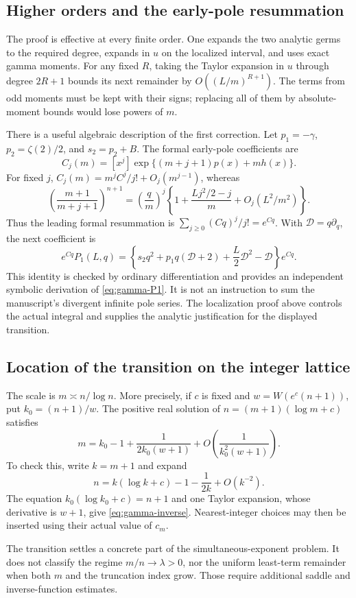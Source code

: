 \subsection{Higher orders and the early-pole resummation}
The proof is effective at every finite order. One expands the two
analytic germs to the required degree, expands in $u$ on the localized
interval, and uses exact gamma moments. For any fixed $R$, taking
the Taylor expansion in $u$ through degree $2R+1$ bounds its next
remainder by $O((L/m)^{R+1})$. The terms from odd moments must be
kept with their signs; replacing all of them by absolute-moment
bounds would lose powers of $m$.

There is a useful algebraic description of the first correction.
Let $p_1=-\gamma$, $p_2=\zeta(2)/2$, and $s_2=p_2+B$.
The formal early-pole coefficients are
\[
 C_j(m)=[x^j]\exp\{(m+j+1)p(x)+mh(x)\}.
\]
For fixed $j$, $C_j(m)=m^jC^j/j!+O_j(m^{j-1})$, whereas
\[
 \left(\frac{m+1}{m+j+1}\right)^{n+1}
 =\left(\frac qm\right)^j
 \left\{1+\frac{Lj^2/2-j}{m}+O_j(L^2/m^2)\right\}.
\]
Thus the leading formal resummation is
$\sum_{j\ge0}(Cq)^j/j!=e^{Cq}$. With $\mathcal D=q\partial_q$,
the next coefficient is
\begin{equation}\label{eq:gamma-operator}
 e^{Cq}P_1(L,q)=
 \left\{s_2q^2+p_1q(\mathcal D+2)
                    +\frac L2\mathcal D^2-\mathcal D\right\}e^{Cq}.
\end{equation}
This identity is checked by ordinary differentiation and provides an
independent symbolic derivation of \eqref{eq:gamma-P1}.
It is not an instruction to sum the manuscript's divergent infinite
pole series. The localization proof above controls the actual integral
and supplies the analytic justification for the displayed transition.

\subsection{Location of the transition on the integer lattice}
The scale is $m\asymp n/\log n$. More precisely, if $c$ is fixed and
$w=W(e^c(n+1))$, put $k_0=(n+1)/w$. The positive real solution of
$n=(m+1)(\log m+c)$ satisfies
\begin{equation}\label{eq:gamma-inverse}
 m=k_0-1+\frac1{2k_0(w+1)}
       +O\!\left(\frac1{k_0^2(w+1)}\right).
\end{equation}
To check this, write $k=m+1$ and expand
\[
 n=k(\log k+c)-1-\frac1{2k}+O(k^{-2}).
\]
The equation $k_0(\log k_0+c)=n+1$ and one Taylor expansion, whose
derivative is $w+1$, give \eqref{eq:gamma-inverse}. Nearest-integer
choices may then be inserted using their actual value of $c_m$.

The transition settles a concrete part of the simultaneous-exponent
problem. It does not classify the regime $m/n\to\lambda>0$, nor the
uniform least-term remainder when both $m$ and the truncation index
grow. Those require additional saddle and inverse-function estimates.
